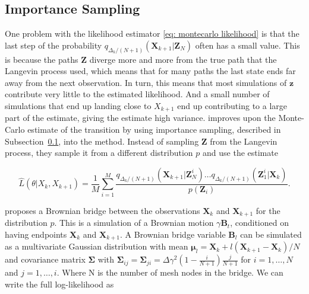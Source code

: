 \subsection{Importance Sampling}
\label{subsec: importance sampling}
One problem with the likelihood estimator \eqref{eq: montecarlo likelihood} is that the last step of the probability $q_{\Delta_k/(N+1)}(\textbf{X}_{k+1}|\textbf{Z}_N)$ often has a small value. This is because the paths $\textbf{Z}$ diverge more and more from the true path that the Langevin process used, which means that for many paths the last state ends far away from the next observation. In turn, this means that most simulations of $\textbf{z}$ contribute very little to the estimated likelihood. And a small number of simulations that end up landing close to $X_{k+1}$ end up contributing to a large part of the estimate, giving the estimate high variance. \parencite{durham_numerical_2002} improves upon the Monte-Carlo estimate of the transition by using importance sampling, described in Subsection~\ref{subsec: importance sampling}, into the method. Instead of sampling $\textbf{Z}$ from the Langevin process, they sample it from a different distribution $p$ and use the estimate

\begin{equation}
\hat{L}(\theta|X_k, X_{k+1}) = \frac{1}{M}\sum_{i=1}^M \frac{q_{\Delta_k/(N+1)}(\textbf{X}_{k+1}|\textbf{Z}^i_N)\dots q_{\Delta_k/(N+1)}(\textbf{Z}^i_1|\textbf{X}_k)}{p(\textbf{Z}_i)}.
\label{eq: importance sampling likelihood}
\end{equation}


\parencite{durham_numerical_2002} proposes a Brownian bridge between the observations $\textbf{X}_k$ and $\textbf{X}_{k+1}$ for the distribution $p$. This is a simulation of a Brownian motion $\gamma \textbf{B}_t$, conditioned on having endpoints $\textbf{X}_k$ and $\textbf{X}_{k+1}$. A Brownian bridge variable $\textbf{B}_l$ can be simulated as a multivariate Gaussian distribution with mean $\bm \mu_l = \textbf{X}_k + l(\textbf{X}_{k+1}-\textbf{X}_k)/N$ and covariance matrix $\bm \Sigma$ with $\bm \Sigma_{ij} = \bm \Sigma_{ji}= \Delta \gamma^2(1-\frac{i}{N+1}) \frac{j}{N+1}$ for $i = 1, \dots , N$ and $j = 1, \dots, i$. Where N is the number of mesh nodes in the bridge. We can write the full log-likelihood as 


